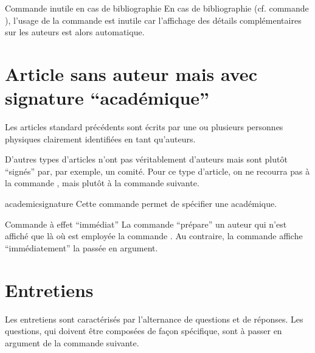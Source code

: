 \begin{dbwarning}{Commande \protect{} inutile
    en cas de bibliographie}{}
  En cas de bibliographie (cf. commande ), l'usage de
  la commande  est inutile car l'affichage des
  détails complémentaires sur les auteurs est alors automatique.
\end{dbwarning}

\section{Article sans auteur mais avec signature \enquote{académique}}
\label{sec:article-sans-auteur}

Les articles standard précédents sont écrits par une ou plusieurs personnes
physiques clairement identifiées en tant qu'auteurs.

D'autres types d'articles n'ont pas véritablement d'auteurs mais sont plutôt
\enquote{signés} par, par exemple, un comité. Pour ce type d'article, on ne
recourra pas à la commande , mais plutôt à la commande
 suivante.

\begin{docCommand}{academicsignature}{}
  Cette commande permet de spécifier une  académique.
\end{docCommand}

\begin{bodycode}
\end{bodycode}

\begin{dbwarning}{Commande \protect{} à effet \enquote{immédiat}}{}
  La commande  \enquote{prépare} un auteur qui n'est affiché que
  là où est employée la commande . Au contraire, la commande
   affiche \enquote{immédiatement} la 
  passée en argument.
\end{dbwarning}

\section{Entretiens}
\label{sec:entretiens}

Les entretiens sont caractérisés par l'alternance de questions et de
réponses. Les questions, qui doivent être composées de façon spécifique, sont
à passer en argument de la commande  suivante.

